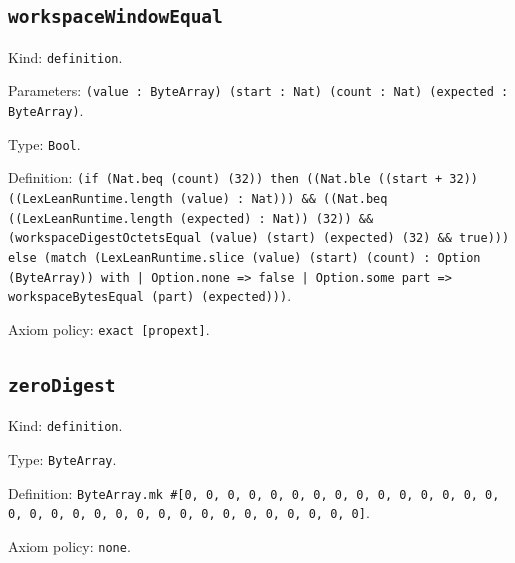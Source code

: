\documentclass[11pt]{article}
\begin{document}
\subsection*{\texttt{workspaceWindowEqual}}
\noindent Kind: \texttt{definition}.\par
\noindent Parameters: \texttt{(value : ByteArray) (start : Nat) (count : Nat) (expected : ByteArray)}.\par
\noindent Type: \texttt{Bool}.\par
\noindent Definition: \texttt{(if (Nat.beq (count) (32)) then ((Nat.ble ((start + 32)) ((LexLeanRuntime.length (value) : Nat))) \&\& ((Nat.beq ((LexLeanRuntime.length (expected) : Nat)) (32)) \&\& (workspaceDigestOctetsEqual (value) (start) (expected) (32) \&\& true))) else (match (LexLeanRuntime.slice (value) (start) (count) : Option (ByteArray)) with | Option.none => false | Option.some part => workspaceBytesEqual (part) (expected)))}.\par
\noindent Axiom policy: \texttt{exact [propext]}.\par
\subsection*{\texttt{zeroDigest}}
\noindent Kind: \texttt{definition}.\par
\noindent Type: \texttt{ByteArray}.\par
\noindent Definition: \texttt{ByteArray.mk \#[0, 0, 0, 0, 0, 0, 0, 0, 0, 0, 0, 0, 0, 0, 0, 0, 0, 0, 0, 0, 0, 0, 0, 0, 0, 0, 0, 0, 0, 0, 0, 0]}.\par
\noindent Axiom policy: \texttt{none}.\par
\end{document}
